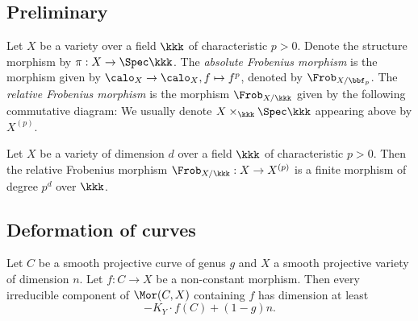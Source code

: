 \subsection{Preliminary}

    \begin{definition}\label{def:Frobinius_morphism}
        Let \(X\) be a variety over a field \(\kkk\) of characteristic \(p > 0\).
        Denote the structure morphism by \(\pi: X \to \Spec \kkk\).
        The \emph{absolute Frobenius morphism} is the morphism given by \(\calo_X \to \calo_X, f \mapsto f^p\), denoted by \(\Frob_{X/\bbf_p}\).
        The \emph{relative Frobenius morphism} is the morphism \(\Frob_{X/\kkk}\) given by the following commutative diagram:
        \Yang{}
        We usually denote \(X \times_{\kkk} \Spec \kkk\) appearing above by \(X^{(p)}\).
    \end{definition}

    \begin{proposition}\label{prop:relative_frobinius_is_finite_of_degree_p^d}
        Let \(X\) be a variety of dimension \(d\) over a field \(\kkk\) of characteristic \(p > 0\).
        Then the relative Frobenius morphism \(\Frob_{X/\kkk}: X \to X^{(p)}\) is a finite morphism of degree \(p^d\) over \(\kkk\).
    \end{proposition}

\subsection{Deformation of curves}

    \begin{theorem}\label{thm:dimension_of_deformation_space_of_curves}
        Let \(C\) be a smooth projective curve of genus \(g\) and \(X\) a smooth projective variety of dimension \(n\).
        Let \(f:C \to X\) be a non-constant morphism.
        Then every irreducible component of \(\Mor(C, X)\) containing \(f\) has dimension at least
        \[ -K_Y\cdot f(C) + (1-g)n. \]
    \end{theorem}

